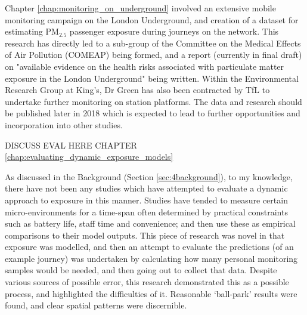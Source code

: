 
Chapter \ref{chap:monitoring_on_underground} involved an extensive mobile monitoring campaign on the London Underground, and creation of a dataset for estimating PM$_{2.5}$ passenger exposure during journeys on the network. This research has directly led to a sub-group of the Committee on the Medical Effects of Air Pollution (COMEAP) being formed, and a report (currently in final draft) on "available evidence on the health risks associated with particulate matter exposure in the London Underground" being written. Within the Environmental Research Group at King's, Dr Green has also been contracted by TfL to undertake further monitoring on station platforms. The data and research should be published later in 2018 which is expected to lead to further opportunities and incorporation into other studies. 


DISCUSS EVAL HERE CHAPTER \ref{chap:evaluating_dynamic_exposure_models}

As discussed in the Background (Section \ref{sec:4background}), to my knowledge, there have not been any studies which have attempted to evaluate a dynamic approach to exposure in this manner. Studies have tended to measure certain micro-environments for a time-span often determined by practical constraints such as battery life, staff time and convenience; and then use these as empirical comparisons to their model outputs.
This piece of research was novel in that exposure was modelled, and then an attempt to evaluate the predictions (of an example journey) was undertaken by calculating how many personal monitoring samples would be needed, and then going out to collect that data. Despite various sources of possible error, this research demonstrated this as a possible process, and highlighted the difficulties of it. Reasonable ‘ball-park’ results were found, and clear spatial patterns were discernible. 

